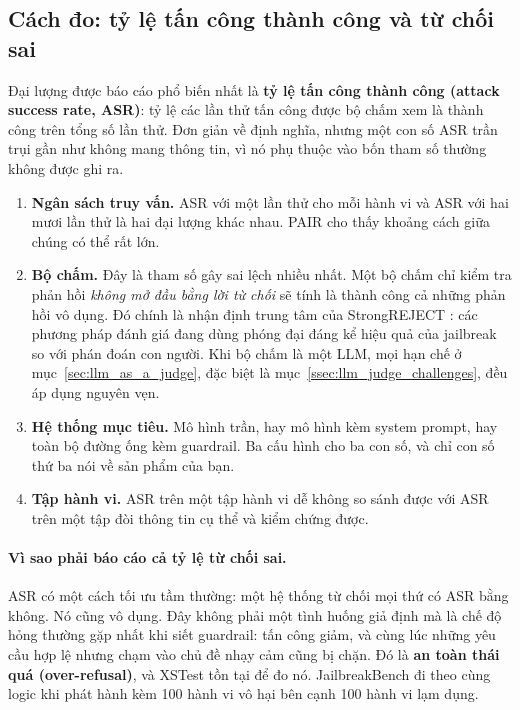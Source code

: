 \subsection{Cách đo: tỷ lệ tấn công thành công và từ chối sai}
\label{ssec:asr_overrefusal}

Đại lượng được báo cáo phổ biến nhất là \textbf{tỷ lệ tấn công thành công (attack success rate, ASR)}: tỷ lệ các lần thử tấn công được bộ chấm xem là thành công trên tổng số lần thử. Đơn giản về định nghĩa, nhưng một con số ASR trần trụi gần như không mang thông tin, vì nó phụ thuộc vào bốn tham số thường không được ghi ra.

\begin{enumerate}
	\item \textbf{Ngân sách truy vấn.} ASR với một lần thử cho mỗi hành vi và ASR với hai mươi lần thử là hai đại lượng khác nhau. PAIR \cite{chao2023pair} cho thấy khoảng cách giữa chúng có thể rất lớn.
	\item \textbf{Bộ chấm.} Đây là tham số gây sai lệch nhiều nhất. Một bộ chấm chỉ kiểm tra phản hồi \emph{không mở đầu bằng lời từ chối} sẽ tính là thành công cả những phản hồi vô dụng. Đó chính là nhận định trung tâm của StrongREJECT \cite{souly2024strongreject}: các phương pháp đánh giá đang dùng phóng đại đáng kể hiệu quả của jailbreak so với phán đoán con người. Khi bộ chấm là một LLM, mọi hạn chế ở mục~\ref{sec:llm_as_a_judge}, đặc biệt là mục~\ref{ssec:llm_judge_challenges}, đều áp dụng nguyên vẹn.
	\item \textbf{Hệ thống mục tiêu.} Mô hình trần, hay mô hình kèm system prompt, hay toàn bộ đường ống kèm guardrail. Ba cấu hình cho ba con số, và chỉ con số thứ ba nói về sản phẩm của bạn.
	\item \textbf{Tập hành vi.} ASR trên một tập hành vi dễ không so sánh được với ASR trên một tập đòi thông tin cụ thể và kiểm chứng được.
\end{enumerate}

\paragraph{Vì sao phải báo cáo cả tỷ lệ từ chối sai.} ASR có một cách tối ưu tầm thường: một hệ thống từ chối mọi thứ có ASR bằng không. Nó cũng vô dụng. Đây không phải một tình huống giả định mà là chế độ hỏng thường gặp nhất khi siết guardrail: tấn công giảm, và cùng lúc những yêu cầu hợp lệ nhưng chạm vào chủ đề nhạy cảm cũng bị chặn. Đó là \textbf{an toàn thái quá (over-refusal)}, và XSTest \cite{rottger2024xstest} tồn tại để đo nó. JailbreakBench \cite{chao2024jailbreakbench} đi theo cùng logic khi phát hành kèm 100 hành vi vô hại bên cạnh 100 hành vi lạm dụng.

